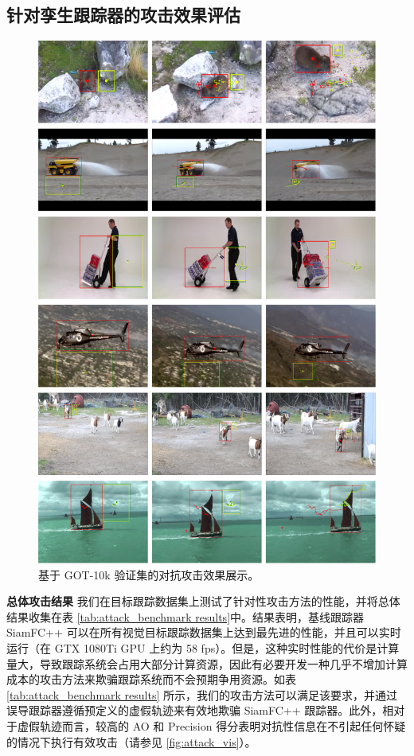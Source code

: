 \subsection{针对孪生跟踪器的攻击效果评估}
\begin{figure}[p]
\centering
\includegraphics[width=1.0\textwidth]{Img/attack/txt_visualize.pdf}
\caption{基于 GOT-10k \cite{GOT-10k} 验证集的对抗攻击效果展示。}
\end{figure}

\textbf{总体攻击结果} 我们在目标跟踪数据集上测试了针对性攻击方法的性能，并将总体结果收集在表 \ref{tab:attack_benchmark results}中。结果表明，基线跟踪器 SiamFC++ 可以在所有视觉目标跟踪数据集上达到最先进的性能，并且可以实时运行（在 GTX 1080Ti GPU 上约为 58 fps）。但是，这种实时性能的代价是计算量大，导致跟踪系统会占用大部分计算资源，因此有必要开发一种几乎不增加计算成本的攻击方法来欺骗跟踪系统而不会预期争用资源。如表 \ref{tab:attack_benchmark results} 所示，我们的攻击方法可以满足该要求，并通过误导跟踪器遵循预定义的虚假轨迹来有效地欺骗 SiamFC++ 跟踪器。此外，相对于虚假轨迹而言，较高的 AO 和 Precision 得分表明对抗性信息在不引起任何怀疑的情况下执行有效攻击（请参见 \ref{fig:attack_vis}）。

